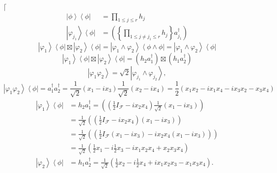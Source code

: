 \documentclass[aps,preprint]{revtex4}%
\begin{document}
$\lceil$%
\begin{align}
\left\vert \phi\right\rangle \left\langle \phi\right\vert  &  =%
{\displaystyle\prod\limits_{1\leq j\leq r}}
h_{j}\\
\left\vert \varphi_{j_{1}}\right\rangle \left\langle \phi\right\vert  &
=\left(  \left\{
{\displaystyle\prod\limits_{1\leq j\neq j_{1}\leq r}}
h_{j}\right\}  a_{j_{1}}^{\dagger}\right)
\end{align}%
\begin{equation}
\left\vert \varphi_{1}\right\rangle \left\langle \phi\right\vert
\boxtimes\left\vert \varphi_{2}\right\rangle \left\langle \phi\right\vert
=\left\vert \varphi_{1}\wedge\varphi_{2}\right\rangle \left\langle \phi
\wedge\phi\right\vert =\left\vert \varphi_{1}\wedge\varphi_{2}\right\rangle
\left\langle \phi\right\vert
\end{equation}%
\begin{equation}
\left\vert \varphi_{1}\right\rangle \left\langle \phi\right\vert
\boxtimes\left\vert \varphi_{2}\right\rangle \left\langle \phi\right\vert
=\left(  h_{2}a_{1}^{\dagger}\right)  \boxtimes\left(  h_{1}a_{2}^{\dagger
}\right)
\end{equation}%
\begin{equation}
\left\vert \varphi_{1}\varphi_{2}\right\rangle =\sqrt{2}\left\vert
\varphi_{j_{1}}\wedge\varphi_{j_{2}}\right\rangle ,
\end{equation}%
\begin{equation}
\left\vert \varphi_{1}\varphi_{2}\right\rangle \left\langle \phi\right\vert
=a_{1}^{\dagger}a_{2}^{\dagger}=\frac{1}{\sqrt{2}}\left(  x_{1}-ix_{3}\right)
\frac{1}{\sqrt{2}}\left(  x_{2}-ix_{4}\right)  =\frac{1}{2}\left(  x_{1}%
x_{2}-ix_{1}x_{4}-ix_{3}x_{2}-x_{3}x_{4}\right)
\end{equation}%
\begin{align}
\left\vert \varphi_{1}\right\rangle \left\langle \phi\right\vert  &
=h_{2}a_{1}^{\dagger}=\left(  \left(  \frac{1}{2}I_{\mathcal{F}}-ix_{2}%
x_{4}\right)  \frac{1}{\sqrt{2}}\left(  x_{1}-ix_{3}\right)  \right) \\
&  =\frac{1}{\sqrt{2}}\left(  \left(  \frac{1}{2}I_{\mathcal{F}}-ix_{2}%
x_{4}\right)  \left(  x_{1}-ix_{3}\right)  \right) \\
&  =\frac{1}{\sqrt{2}}\left(  \left(  \frac{1}{2}I_{\mathcal{F}}\left(
x_{1}-ix_{3}\right)  -ix_{2}x_{4}\left(  x_{1}-ix_{3}\right)  \right)  \right)
\\
&  =\frac{1}{\sqrt{2}}\left(  \frac{1}{2}x_{1}-i\frac{1}{2}x_{3}-ix_{1}%
x_{2}x_{4}+x_{2}x_{3}x_{4}\right) \\
\left\vert \varphi_{2}\right\rangle \left\langle \phi\right\vert  &
=h_{1}a_{2}^{\dagger}=\frac{1}{\sqrt{2}}\left(  \frac{1}{2}x_{2}-i\frac{1}%
{2}x_{4}+ix_{1}x_{2}x_{3}-x_{1}x_{3}x_{4}\right)  .
\end{align}%
\end{document}

